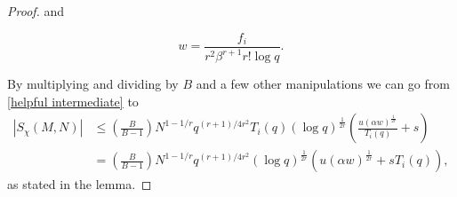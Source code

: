 \documentclass[12pt]{amsart}
\theoremstyle{plain}
\theoremstyle{definition}
\begin{document}
\begin{proof}
and

\begin{equation}
\label{w}
    w
    = \frac{f_i}{r^2 \beta^{r+1} r! \log{q}}.
\end{equation}

By multiplying and dividing by $B$ and a few other manipulations we can go from \eqref{helpful intermediate} to 
\begin{equation}
\begin{split}
    \left| S_\chi(M, N) \right|
    &\le
    \left(\frac{B}{B-1}\right)N^{1-1/r}q^{(r+1)/{4r^2}}T_i(q)(\log q)^{\frac{1}{2r}}
    \left(
    \frac{u({\alpha w})^{\frac{1}{2r}}}{T_i(q)} 
    +s
    \right) \\
    &=
    \left(\frac{B}{B-1}\right)N^{1-1/r}q^{(r+1)/{4r^2}}(\log q)^{\frac{1}{2r}}
    \left(
    u(\alpha w)^{\frac{1}{2r}}
    +sT_i(q)
    \right),
\end{split} 
\end{equation}
as stated in the lemma.
\end{proof}
\end{document}
